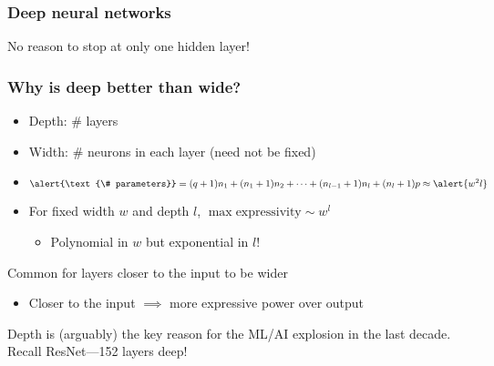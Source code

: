 \begin{frame}
    \frametitle{Deep neural networks}

    No reason to stop at only one hidden layer!

    \vspace{1mm}
    
    \vspace{1mm}

\end{frame}

\begin{frame}
    \frametitle{Why is deep better than wide?}
    \begin{itemize}
        \item Depth: \# layers
        \item Width: \# neurons in each layer (need not be fixed)
        \pause
        \item $\alert{\text{\# parameters}} = (q + 1) n_1 + (n_1 + 1) n_2 + \cdots + (n_{l-1} + 1) n_l + (n_l + 1) p \approx \alert{w^2 l}$
        \item For fixed width $w$ and depth $l$, \alert{$\max \text{expressivity} \sim w^l$} \citep{Pascanu13,MontufarNIPS14,Chen16}
        \begin{itemize}
            \item Polynomial in $w$ but exponential in $l$!
        \end{itemize}
    \end{itemize}
    \pause

    Common for layers closer to the input to be wider
    \begin{itemize}
        \item Closer to the input $\implies$ more expressive power over output \citep{RaghuICML17}
    \end{itemize}
    \pause

    \begin{block}{}
        Depth is (arguably) the key reason for the ML/AI explosion in the last decade.
        Recall ResNet---152 layers deep!
    \end{block}
\end{frame}

